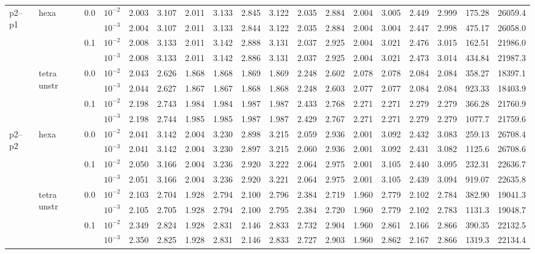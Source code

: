 \begin{longtable}{llclrrrrrrrrrrrrrr}
\multirow{8}{*}{p2--p1} & \multirow{4}{*}{hexa} & \multirow{2}{*}{0.0} & $10^{-2}$ & 2.003 & 3.107 & 2.011 & 3.133 & 2.845 & 3.122 & 2.035 & 2.884 & 2.004 & 3.005 & 2.449 & 2.999 & 175.28 & 26059.4 \\
& & & $10^{-3}$ & 2.004 & 3.107 & 2.011 & 3.133 & 2.844 & 3.122 & 2.035 & 2.884 & 2.004 & 3.004 & 2.447 & 2.998 & 475.17 & 26058.0 \\\cline{3-18}
& & \multirow{2}{*}{0.1} & $10^{-2}$ & 2.008 & 3.133 & 2.011 & 3.142 & 2.888 & 3.131 & 2.037 & 2.925 & 2.004 & 3.021 & 2.476 & 3.015 & 162.51 & 21986.0 \\
& & & $10^{-3}$ & 2.008 & 3.133 & 2.011 & 3.142 & 2.886 & 3.131 & 2.037 & 2.925 & 2.004 & 3.021 & 2.473 & 3.014 & 434.84 & 21987.3 \\\cline{2-18}
& \multirow{4}{*}{tetra unstr} & \multirow{2}{*}{0.0} & $10^{-2}$ & 2.043 & 2.626 & 1.868 & 1.868 & 1.869 & 1.869 & 2.248 & 2.602 & 2.078 & 2.078 & 2.084 & 2.084 & 358.27 & 18397.1 \\
& & & $10^{-3}$ & 2.044 & 2.627 & 1.867 & 1.867 & 1.868 & 1.868 & 2.248 & 2.603 & 2.077 & 2.077 & 2.084 & 2.084 & 923.33 & 18403.9 \\\cline{3-18}
& & \multirow{2}{*}{0.1} & $10^{-2}$ & 2.198 & 2.743 & 1.984 & 1.984 & 1.987 & 1.987 & 2.433 & 2.768 & 2.271 & 2.271 & 2.279 & 2.279 & 366.28 & 21760.9 \\
& & & $10^{-3}$ & 2.198 & 2.744 & 1.985 & 1.985 & 1.987 & 1.987 & 2.429 & 2.767 & 2.271 & 2.271 & 2.279 & 2.279 & 1077.7 & 21759.6 \\\hline

\multirow{8}{*}{p2--p2} & \multirow{4}{*}{hexa} & \multirow{2}{*}{0.0} & $10^{-2}$ & 2.041 & 3.142 & 2.004 & 3.230 & 2.898 & 3.215 & 2.059 & 2.936 & 2.001 & 3.092 & 2.432 & 3.083 & 259.13 & 26708.4 \\
& & & $10^{-3}$ & 2.041 & 3.142 & 2.004 & 3.230 & 2.897 & 3.215 & 2.060 & 2.936 & 2.001 & 3.092 & 2.431 & 3.082 & 1125.6 & 26708.6 \\\cline{3-18}
& & \multirow{2}{*}{0.1} & $10^{-2}$ & 2.050 & 3.166 & 2.004 & 3.236 & 2.920 & 3.222 & 2.064 & 2.975 & 2.001 & 3.105 & 2.440 & 3.095 & 232.31 & 22636.7 \\
& & & $10^{-3}$ & 2.051 & 3.166 & 2.004 & 3.236 & 2.920 & 3.221 & 2.064 & 2.975 & 2.001 & 3.105 & 2.439 & 3.094 & 919.07 & 22635.8 \\\cline{2-18}
& \multirow{4}{*}{tetra unstr} & \multirow{2}{*}{0.0} & $10^{-2}$ & 2.103 & 2.704 & 1.928 & 2.794 & 2.100 & 2.796 & 2.384 & 2.719 & 1.960 & 2.779 & 2.102 & 2.784 & 382.90 & 19041.3 \\
& & & $10^{-3}$ & 2.105 & 2.705 & 1.928 & 2.794 & 2.100 & 2.795 & 2.384 & 2.720 & 1.960 & 2.779 & 2.102 & 2.783 & 1131.3 & 19048.7 \\\cline{3-18}
& & \multirow{2}{*}{0.1} & $10^{-2}$ & 2.349 & 2.824 & 1.928 & 2.831 & 2.146 & 2.833 & 2.732 & 2.904 & 1.960 & 2.861 & 2.166 & 2.866 & 390.35 & 22132.5 \\
& & & $10^{-3}$ & 2.350 & 2.825 & 1.928 & 2.831 & 2.146 & 2.833 & 2.727 & 2.903 & 1.960 & 2.862 & 2.167 & 2.866 & 1319.3 & 22134.4 \\\hline


\end{longtable}
